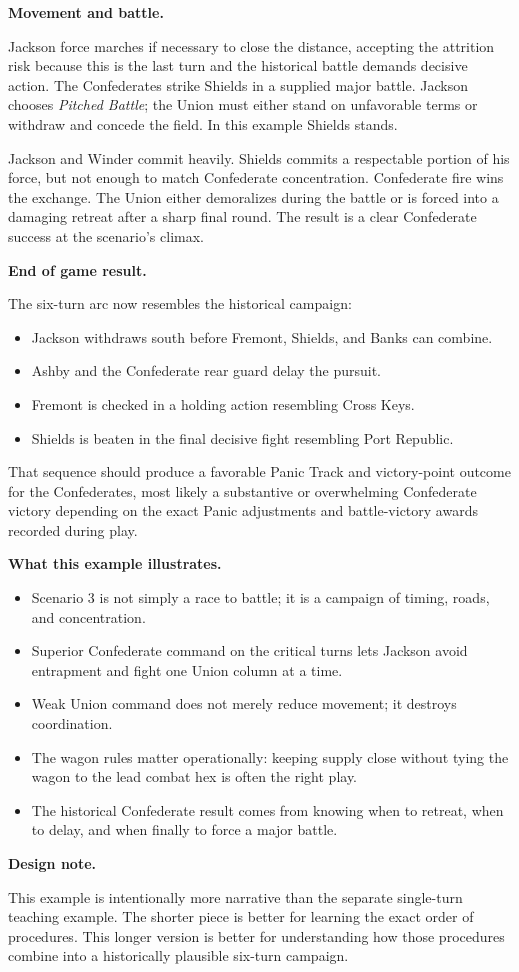 \documentclass[11pt]{article}
\begin{document}
\textbf{Movement and battle.}

Jackson force marches if necessary to close the distance, accepting the attrition risk because this is the last turn and the historical battle demands decisive action. The Confederates strike Shields in a supplied major battle. Jackson chooses \textit{Pitched Battle}; the Union must either stand on unfavorable terms or withdraw and concede the field. In this example Shields stands.

Jackson and Winder commit heavily. Shields commits a respectable portion of his force, but not enough to match Confederate concentration. Confederate fire wins the exchange. The Union either demoralizes during the battle or is forced into a damaging retreat after a sharp final round. The result is a clear Confederate success at the scenario's climax.

\textbf{End of game result.}

The six-turn arc now resembles the historical campaign:

\begin{itemize}
\item Jackson withdraws south before Fremont, Shields, and Banks can combine.
\item Ashby and the Confederate rear guard delay the pursuit.
\item Fremont is checked in a holding action resembling Cross Keys.
\item Shields is beaten in the final decisive fight resembling Port Republic.
\end{itemize}

That sequence should produce a favorable Panic Track and victory-point outcome for the Confederates, most likely a substantive or overwhelming Confederate victory depending on the exact Panic adjustments and battle-victory awards recorded during play.

\textbf{What this example illustrates.}

\begin{itemize}
\item Scenario 3 is not simply a race to battle; it is a campaign of timing, roads, and concentration.
\item Superior Confederate command on the critical turns lets Jackson avoid entrapment and fight one Union column at a time.
\item Weak Union command does not merely reduce movement; it destroys coordination.
\item The wagon rules matter operationally: keeping supply close without tying the wagon to the lead combat hex is often the right play.
\item The historical Confederate result comes from knowing when to retreat, when to delay, and when finally to force a major battle.
\end{itemize}

\textbf{Design note.}

This example is intentionally more narrative than the separate single-turn teaching example. The shorter piece is better for learning the exact order of procedures. This longer version is better for understanding how those procedures combine into a historically plausible six-turn campaign.
\end{document}
